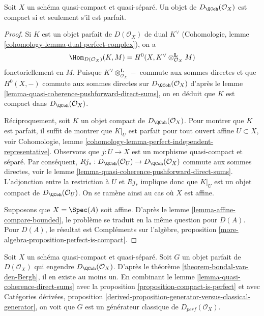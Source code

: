 \begin{proposition}
\label{proposition-compact-is-perfect}
Soit $X$ un schéma quasi-compact et quasi-séparé.
Un objet de $D_\QCoh(\mathcal{O}_X)$ est compact
si et seulement s'il est parfait.
\end{proposition}

\begin{proof}
Si $K$ est un objet parfait de $D(\mathcal{O}_X)$ de dual
$K^\vee$ (Cohomologie, lemme \ref{cohomology-lemma-dual-perfect-complex}),
on a
$$
\Hom_{D(\mathcal{O}_X)}(K, M) =
H^0(X, K^\vee \otimes_{\mathcal{O}_X}^\mathbf{L} M)
$$
fonctoriellement en $M$. Puisque $K^\vee \otimes_{\mathcal{O}_X}^\mathbf{L} -$
commute aux sommes directes et que $H^0(X, -)$ commute aux sommes
directes sur $D_\QCoh(\mathcal{O}_X)$ d'après le
lemme \ref{lemma-quasi-coherence-pushforward-direct-sums},
on en déduit que $K$ est compact dans $D_\QCoh(\mathcal{O}_X)$.

\medskip\noindent
Réciproquement, soit $K$ un objet compact de $D_\QCoh(\mathcal{O}_X)$.
Pour montrer que $K$ est parfait, il suffit de montrer que
$K|_U$ est parfait pour tout ouvert affine $U \subset X$, voir
Cohomologie, lemme \ref{cohomology-lemma-perfect-independent-representative}.
Observons que $j : U \to X$ est un morphisme quasi-compact et séparé.
Par conséquent,
$Rj_* : D_\QCoh(\mathcal{O}_U) \to D_\QCoh(\mathcal{O}_X)$
commute aux sommes directes, voir le
lemme \ref{lemma-quasi-coherence-pushforward-direct-sums}.
L'adjonction entre la restriction à $U$ et $Rj_*$ implique donc que
$K|_U$ est un objet compact de $D_\QCoh(\mathcal{O}_U)$.
On se ramène ainsi au cas où $X$ est affine.

\medskip\noindent
Supposons que $X = \Spec(A)$ soit affine. D'après le lemme \ref{lemma-affine-compare-bounded},
le problème se traduit en la même question pour $D(A)$.
Pour $D(A)$, le résultat est
Compléments sur l'algèbre, proposition \ref{more-algebra-proposition-perfect-is-compact}.
\end{proof}

\begin{remark}
\label{remark-classical-generator}
Soit $X$ un schéma quasi-compact et quasi-séparé. Soit $G$ un
objet parfait de $D(\mathcal{O}_X)$ qui engendre
$D_\QCoh(\mathcal{O}_X)$. D'après le théorème \ref{theorem-bondal-van-den-Bergh},
il en existe au moins un. En combinant le
lemme \ref{lemma-quasi-coherence-direct-sums} avec la
proposition \ref{proposition-compact-is-perfect} et avec
Catégories dérivées, proposition
\ref{derived-proposition-generator-versus-classical-generator},
on voit que $G$ est un générateur classique de $D_{perf}(\mathcal{O}_X)$.
\end{remark}


